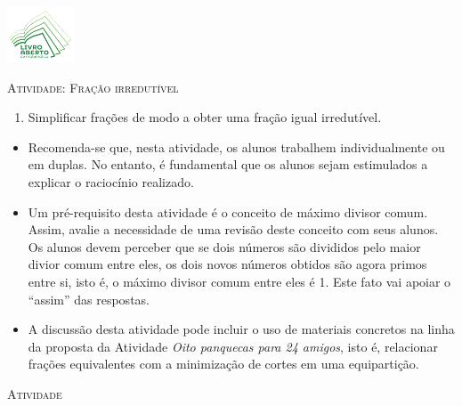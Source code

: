 \documentclass[10 pt,usenames,dvipsnames, oneside]{article}
\begin{document}
\begin{center}
  \begin{minipage}[l]{3cm}
\includegraphics[width=2cm]{../../../Figuras/logo}       
\end{minipage}\hfill
\begin{minipage}[r]{.8\textwidth}
 {\Large \scshape Atividade: Fração irredutível}  
\end{minipage}
\end{center}
\vspace{.2cm}

\ifdefined\prof
\begin{goals}
\begin{enumerate}
\item       Simplificar frações de modo a obter uma fração igual
irredutível.
\end{enumerate}

\tcblower

\begin{itemize}
\item       Recomenda-se que, nesta atividade, os alunos trabalhem
individualmente ou em duplas. No entanto, é fundamental que os alunos sejam
estimulados a explicar o raciocínio realizado.
\item       Um pré-requisito desta atividade é o conceito de máximo divisor
comum. Assim, avalie a necessidade de uma revisão deste conceito com seus
alunos. Os alunos devem perceber que se dois números são divididos pelo maior
divior comum entre eles, os dois novos números obtidos são agora primos entre
si, isto é, o máximo divisor comum entre eles é 1. Este fato vai apoiar o
``assim''       das respostas.
\item       A discussão desta atividade pode incluir o uso de materiais
concretos na linha da proposta da Atividade \textit{Oito panquecas para 24 amigos}, isto é, relacionar
frações equivalentes com a minimização de cortes em uma equipartição.
\end{itemize}
\end{goals}

\bigskip
\begin{center}
{\large \scshape Atividade}
\end{center}
\fi
\end{document}
